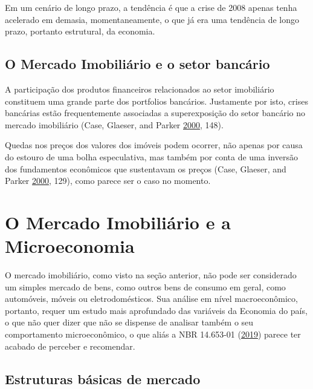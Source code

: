 \documentclass[
	12pt,				%
	oneside,			%
	a4paper,			%
	chapter=TITLE,		%
	section=TITLE,		%
	english,			%
	brazil				%
	]{abntex2}
\begin{document}
Em um cenário de longo prazo, a tendência é que a crise de 2008 apenas tenha
acelerado em demasia, momentaneamente, o que já era uma tendência de longo
prazo, portanto estrutural, da economia.

\hypertarget{MI-e-o-setor-bancario}{%
\subsection{O Mercado Imobiliário e o setor bancário}\label{MI-e-o-setor-bancario}}

A participação dos produtos financeiros relacionados ao setor imobiliário
constituem uma grande parte dos portfolios bancários. Justamente por isto,
crises bancárias estão frequentemente associadas a superexposição do setor
bancário no mercado imobiliário (Case, Glaeser, and Parker \protect\hyperlink{ref-Case2000}{2000}, 148).

Quedas nos preços dos valores dos imóveis podem ocorrer, não apenas por causa
do estouro de uma bolha especulativa, mas também por conta de uma inversão dos
fundamentos econômicos que sustentavam os preços (Case, Glaeser, and Parker \protect\hyperlink{ref-Case2000}{2000}, 129), como parece
ser o caso no momento.

\hypertarget{micro}{%
\section{O Mercado Imobiliário e a Microeconomia}\label{micro}}

O mercado imobiliário, como visto na seção anterior, não pode ser
considerado um simples mercado de bens, como outros bens de consumo em geral,
como automóveis, móveis ou eletrodomésticos. Sua análise em nível macroeconômico,
portanto, requer um estudo mais aprofundado das variáveis da Economia do país,
o que não quer dizer que não se dispense de analisar também o seu comportamento
microeconômico, o que aliás a NBR 14.653-01 (\protect\hyperlink{ref-NBR1465301}{2019}) parece ter acabado de
perceber e recomendar.

\hypertarget{estruturas-buxe1sicas-de-mercado}{%
\subsection{Estruturas básicas de mercado}\label{estruturas-buxe1sicas-de-mercado}}
\end{document}
